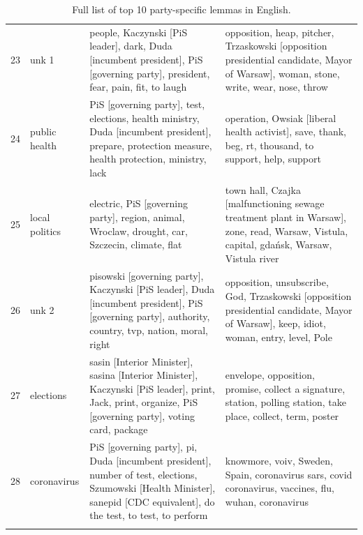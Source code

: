 \documentclass{article}
\begin{document}
\begin{otherlanguage}{polish}
\begin{longtable}{p{2cm}p{2cm}p{5cm}p{5cm}}
	23 &                    unk 1 &                                                     people, Kaczynski [PiS leader], dark, Duda [incumbent president], PiS [governing party], president, fear, pain, fit, to laugh &                                                              opposition, heap, pitcher, Trzaskowski [opposition presidential candidate, Mayor of Warsaw], woman, stone, write, wear, nose, throw \\
	24 &            public health &                               PiS [governing party], test, elections, health ministry, Duda [incumbent president], prepare, protection measure, health protection, ministry, lack &                                                                                           operation, Owsiak [liberal health activist], save, thank, beg, rt, thousand, to support, help, support \\
	25 &           local politics &                                                                                   electric, PiS [governing party], region, animal, Wroclaw, drought, car, Szczecin, climate, flat &                                                         town hall, Czajka [malfunctioning sewage treatment plant in Warsaw], zone, read, Warsaw, Vistula, capital, gdańsk, Warsaw, Vistula river \\
	26 &                    unk 2 &                              pisowski [governing party], Kaczynski [PiS leader], Duda [incumbent president], PiS [governing party], authority, country, tvp, nation, moral, right &                                                           opposition, unsubscribe, God, Trzaskowski [opposition presidential candidate, Mayor of Warsaw], keep, idiot, woman, entry, level, Pole \\
	27 &                elections &                          sasin [Interior Minister], sasina [Interior Minister], Kaczynski [PiS leader], print, Jack, print, organize, PiS [governing party], voting card, package &                                                                                  envelope, opposition, promise, collect a signature, station, polling station, take place, collect, term, poster \\
	28 &              coronavirus &         PiS [governing party], pi, Duda [incumbent president], number of test, elections, Szumowski [Health Minister], sanepid [CDC equivalent], do the test, to test, to perform &                                                                                            knowmore, voiv, Sweden, Spain, coronavirus sars, covid coronavirus, vaccines, flu, wuhan, coronavirus \\
	\bottomrule
	
		\caption{Full list of top 10 party-specific lemmas in English.}
		\label{tab:party_phrases_en_full}
	\end{longtable}
	
	
\end{otherlanguage}
	
\end{document}
